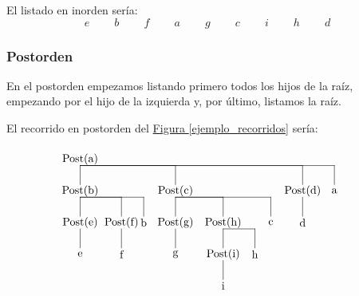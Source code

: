 \documentclass[10pt,a4paper,spanish]{report}
\begin{document}
\noindent
El listado en inorden sería:
\begin{displaymath}
e \qquad\ b \qquad\ f \qquad\ a \qquad\ g \qquad\ c \qquad\ i \qquad\ h \qquad\ d
\end{displaymath}

\subsubsection{\textcolor[rgb]{0.3,0.4,0.8}Postorden}
\noindent
En el postorden empezamos listando primero todos los hijos de la raíz, empezando por el hijo de la izquierda y, por último, listamos la raíz.

\noindent
El recorrido en postorden del \hyperref[ejemplo_recorridos]{Figura \ref*{ejemplo_recorridos}} sería:
\[\begin{xy}
,(0,0)*+=<10mm>\txt<2cm>{Post(a)}
,(0,-10)*+=<10mm>\txt<2cm>{Post(b)}
,(0,-20)*+=<10mm>\txt<2cm>{Post(e)}
,(0,-30)*+=<10mm>\txt<2cm>{e}
,(13,-20)*+=<10mm>\txt<2cm>{Post(f)}
,(13,-30)*+=<10mm>\txt<2cm>{f}
,(20,-20)*+=<10mm>\txt<2cm>{b}
,(30,-10)*+=<10mm>\txt<2cm>{Post(c)}
,(30,-20)*+=<10mm>\txt<2cm>{Post(g)}
,(30,-30)*+=<10mm>\txt<2cm>{g}
,(45,-20)*+=<10mm>\txt<2cm>{Post(h)}
,(45,-30)*+=<10mm>\txt<2cm>{Post(i)}
,(45,-40)*+=<10mm>\txt<2cm>{i}
,(55,-30)*+=<10mm>\txt<2cm>{h}
,(60,-20)*+=<10mm>\txt<2cm>{c}
,(70,-10)*+=<10mm>\txt<2cm>{Post(d)}
,(70,-20)*+=<10mm>\txt<2cm>{d}
,(80,-10)*+=<10mm>\txt<2cm>{a}

\ar@{-} (0,-2);(0,-8)
\ar@{-} (0,-12);(0,-18)
\ar@{-} (0,-22);(0,-28)
\ar@{-} (0,-12);(13,-12)
\ar@{-} (13,-12);(13,-18)
\ar@{-} (13,-22);(13,-28)
\ar@{-} (0,-12);(20,-12)
\ar@{-} (20,-12);(20,-18)
\ar@{-} (0,-2);(30,-2)
\ar@{-} (30,-2);(30,-8)
\ar@{-} (30,-12);(30,-18)
\ar@{-} (30,-22);(30,-28)
\ar@{-} (30,-12);(45,-12)
\ar@{-} (45,-12);(45,-18)
\ar@{-} (45,-22);(45,-28)
\ar@{-} (45,-32);(45,-38)
\ar@{-} (45,-22);(55,-22)
\ar@{-} (55,-22);(55,-28)
\ar@{-} (30,-12);(60,-12)
\ar@{-} (60,-12);(60,-18)
\ar@{-} (0,-2);(70,-2)
\ar@{-} (70,-2);(70,-8)
\ar@{-} (70,-12);(70,-18)
\ar@{-} (0,-2);(80,-2)
\ar@{-} (80,-2);(80,-8)
\end{xy}\]
\end{document}
